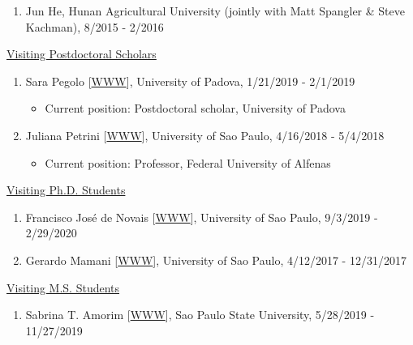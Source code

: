\documentclass[margin,line,10pt]{res}
\begin{document}
\begin{resume}
\begin{enumerate}
  \vspace{0.3cm}

\item Jun He, Hunan Agricultural University (jointly with Matt Spangler \& Steve Kachman),  8/2015 - 2/2016 
\end{enumerate}


\begin{flushleft}
\hspace{0.2cm} \underline{Visiting Postdoctoral Scholars}
\end{flushleft}
\begin{enumerate}
\item Sara Pegolo [\textcolor{blue}{\href{https://www.researchgate.net/profile/Sara_Pegolo}{WWW}}], University of Padova, 1/21/2019 - 2/1/2019
  \begin{itemize} 
    \item Current position: Postdoctoral scholar, University of Padova
  \end{itemize}
  
  \vspace{0.3cm}

\item Juliana Petrini  [\textcolor{blue}{\href{https://www.researchgate.net/profile/Juliana_Petrini}{WWW}}], University of Sao Paulo, 4/16/2018 - 5/4/2018
  \begin{itemize} 
  \item Current position: Professor, Federal University of Alfenas
  \end{itemize}
\end{enumerate}


\begin{flushleft}
\hspace{0.2cm} \underline{Visiting Ph.D. Students}
\end{flushleft}
\begin{enumerate}
\item Francisco Jos\'{e} de Novais [\textcolor{blue}{\href{https://fjnovais.github.io/}{WWW}}], University of Sao Paulo, 9/3/2019 - 2/29/2020

\vspace{0.3cm}

\item Gerardo Mamani [\textcolor{blue}{\href{https://github.com/gerardocorn}{WWW}}], University of Sao Paulo, 4/12/2017 - 12/31/2017
\end{enumerate}

\begin{flushleft}
\hspace{0.2cm} \underline{Visiting M.S. Students}
\end{flushleft}
\begin{enumerate}
\item Sabrina T. Amorim [\textcolor{blue}{\href{https://sabrinaam.github.io/}{WWW}}], Sao Paulo State University, 5/28/2019 - 11/27/2019
\end{enumerate}



\end{resume}
\end{document}
